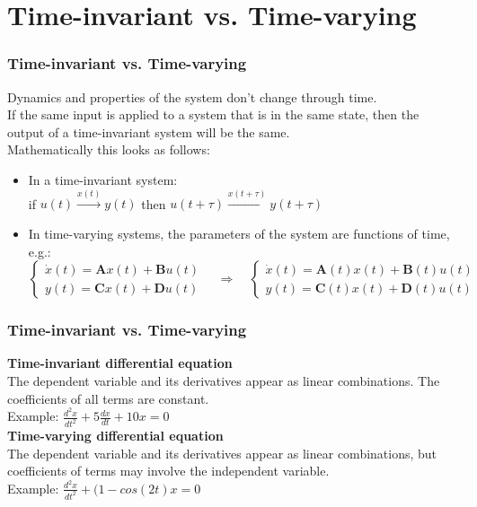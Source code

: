 \documentclass{beamer}
\begin{document}
\section{Time-invariant vs. Time-varying} 

\begin{frame}
\frametitle{Time-invariant vs. Time-varying}
Dynamics and properties of the system don't change through time.\\
If the same input is applied to a system that is in the same state, then the output of a time-invariant system will be the same.\\
\bigskip
Mathematically this looks as follows:\\
\begin{itemize}
\item In a time-invariant system:\\
if $u(t) \xrightarrow{x(t)} y(t)$ then $u(t+\tau) \xrightarrow{x(t+\tau)} y(t+\tau)$
\medskip
\item In time-varying systems, the parameters of the system are functions of time, e.g.:\\
\vspace{-2ex}
\begin{equation*}
\begin{cases}
             \dot{x}(t) = \textbf{A}x(t) + \textbf{B}u(t)\\
             y(t) = \textbf{C}x(t) + \textbf{D}u(t)
       \end{cases} \quad
\Rightarrow \quad
\begin{cases}
            \dot{x}(t) = \textbf{A}(t)x(t) + \textbf{B}(t)u(t)\\
             y(t) = \textbf{C}(t)x(t) + \textbf{D}(t)u(t)
       \end{cases}
\end{equation*}
\end{itemize}
\end{frame}


\begin{frame}
\frametitle{Time-invariant vs. Time-varying}
\vspace{-6ex}
\textbf{Time-invariant differential equation}\\
\medskip
The dependent variable and its derivatives appear as linear combinations. The coefficients of all terms are constant.\\
Example: $\frac{d^{2}x}{dt^{2}} + 5\frac{dx}{dt} + 10x=0$\\
\bigskip
\bigskip
\textbf{Time-varying differential equation}\\
\medskip
The dependent variable and its derivatives appear as linear combinations, but coefficients of terms may involve the independent variable.\\
Example: $\frac{d^{2}x}{dt^{2}} + (1-cos(2t)x = 0$
\end{frame}
\end{document}
